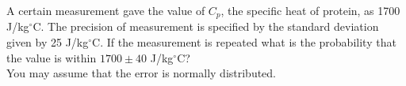 \documentclass[a4paper,11pt,dvipsnames]{book}
\begin{document}
\begin{question}

A certain measurement gave the value of $C_p$, the specific heat of protein, as 1700 J/kg$^{\circ}$C. The precision of measurement is specified by the standard deviation given by 25 J/kg$^{\circ}$C.
If the measurement is repeated what is the probability that the value is within $1700 \pm 40$ J/kg$^{\circ}$C? \\
You may assume that the error is normally distributed.
\examspace*{10em}

\end{question}
\begin{solution}

\end{solution}




\end{document}
